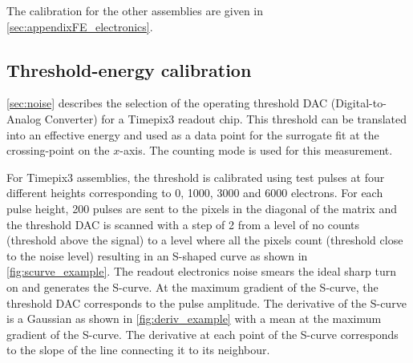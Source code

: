 The calibration for the other assemblies are given in
\cref{sec:appendixFE_electronics}.


\subsection{Threshold-energy calibration} 
\label{sec:thresholdCalibration}

\cref{sec:noise} describes the selection of the operating threshold
DAC (Digital-to-Analog Converter) for a Timepix3 readout chip. This
threshold can be translated into an effective energy and used as a
data point for the surrogate fit at the crossing-point on the
$x$-axis. The counting mode is used for this measurement.

For Timepix3 assemblies, the threshold is calibrated using test pulses
at four different heights corresponding to 0, 1000, 3000 and 6000
electrons. For each pulse height, 200 pulses are sent to the pixels in
the diagonal of the matrix and the threshold DAC is scanned with a
step of 2 from a level of no counts (threshold above the signal) to a
level where all the pixels count (threshold close to the noise level)
resulting in an S-shaped curve as shown in
\cref{fig:scurve_example}. The readout electronics noise smears the
ideal sharp turn on and generates the S-curve. At the maximum gradient
of the S-curve, the threshold DAC corresponds to the pulse
amplitude. The derivative of the S-curve is a Gaussian as shown in
\cref{fig:deriv_example} with a mean at the maximum gradient of the
S-curve. The derivative at each point of the S-curve corresponds to
the slope of the line connecting it to its neighbour.

